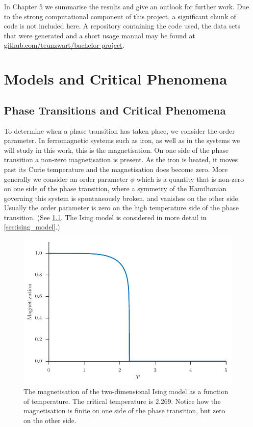 \documentclass[11pt, a4paper]{report} %
\begin{document}
In Chapter 5 we summarise the results and give an outlook for further work.
Due to the strong computational component of this project, a significant chunk of code is not included here.
A repository containing the code used, the data sets that were generated and a short usage manual may be found at \url{github.com/teunzwart/bachelor-project}.


\chapter{Models and Critical Phenomena}

\section{Phase Transitions and Critical Phenomena}
To determine when a phase transition has taken place, we consider the order parameter.
In ferromagnetic systems such as iron, as well as in the systems we will study in this work, this is the magnetisation.
On one side of the phase transition a non-zero magnetisation is present.
As the iron is heated, it moves past its Curie temperature and the magnetisation does become zero.
More generally we consider an order parameter \(\phi\) which is a quantity that is non-zero on one side of the phase transition, where a symmetry of the Hamiltonian governing this system is spontaneously broken, and vanishes on the other side. Usually the order parameter is zero on the high temperature side of the phase transition. (See \cref{fig:ising_magnetization}. The Ising model is considered in more detail in \cref{sec:ising_model}.)


\begin{figure}[htb]
	\centering
	\includegraphics[width=0.85\linewidth]{ising_magnetization}
	\caption{The magnetisation of the two-dimensional Ising model as a function of temperature. The critical temperature is 2.269. Notice how the magnetisation is finite on one side of the phase transition, but zero on the other side.}
	\label{fig:ising_magnetization}
\end{figure}
\end{document}
